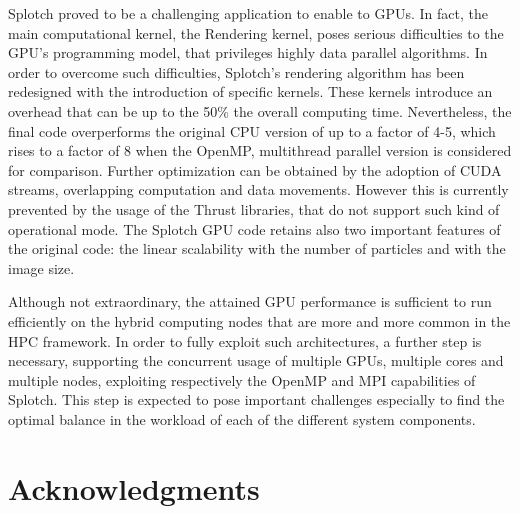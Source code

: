 \documentclass[1p]{elsarticle}
\begin{document}
Splotch proved to be a challenging application to enable to GPUs. 
In fact, the main computational kernel, the Rendering kernel, poses serious difficulties
to the GPU's programming model, that privileges highly data parallel algorithms.
In order to overcome such difficulties, Splotch's rendering algorithm has been
redesigned with the introduction of specific kernels. These kernels 
introduce an overhead that can be up to the 50\% the overall computing
time. Nevertheless, the final code overperforms the original CPU
version of up to a factor of 4-5, which rises to a factor of 8 when the OpenMP,
multithread parallel version is considered for comparison. Further optimization can
be obtained by the adoption of CUDA streams, overlapping computation 
and data movements. However this is currently prevented by the usage of the 
Thrust libraries, that do not support such kind of operational mode. 
The Splotch GPU code retains also two important features of the original
code: the linear scalability with the number of particles and with the 
image size. 

Although not extraordinary, the attained GPU performance is sufficient 
to run efficiently on the hybrid computing nodes that are more and 
more common in the HPC framework. In order to fully exploit such architectures, 
a further step is necessary, supporting the concurrent usage of 
multiple GPUs, multiple cores and multiple nodes, exploiting respectively the OpenMP and
MPI capabilities of Splotch. This step is expected to pose important 
challenges especially to find the optimal balance in the workload of each of the different 
system components.

\section*{Acknowledgments}


	
\end{document}
